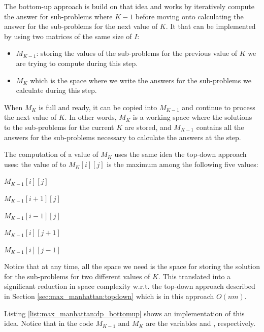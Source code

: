 The bottom-up approach is build on that idea and works by iteratively compute the answer for sub-problems where $K-1$ before moving onto calculating the answer for the sub-problems for the next value of $K$.
It that can be implemented by using two matrices of the same size of $I$:
\begin{itemize}
	\item $M_{K-1}$: storing the values of the sub-problems for the previous value of $K$ we are trying to compute during this step.
	\item $M_{K}$ which is the space where we write the answers for the sub-problems we calculate during this step.
\end{itemize}
When $M_{K}$ is full and ready, it can be copied into $M_{K-1}$ and continue to process the next value of $K$. In other words,
$M_{K}$ is a working space where the solutions to the sub-problems for the current $K$ are stored,
and $M_{K-1}$ contains all the answers for the sub-problems necessary to calculate the answers at the step.

The computation of a value of $M_{K}$ uses the same idea the top-down approach uses: the value of  to $M_K[i][j]$ is the maximum  among
the following five values: 
\begin{enumerate*}
	\item $M_{K-1}[i][j]$
	\item $M_{K-1}[i+1][j]$
	\item $M_{K-1}[i-1][j]$
	\item $M_{K-1}[i][j+1]$
	\item $M_{K-1}[i][j-1]$
\end{enumerate*}

Notice that at any time, all the space we need is the space for storing the solution for the sub-problems for two different values of $K$.
This translated into a significant reduction in  space complexity w.r.t. the top-down approach described in Section \ref{sec:max_manhattan:topdown} which is in this approach $O(nm)$.

Listing \ref{list:max_manhattan:dp_bottomup} shows an implementation of this idea. Notice that in the code $M_{K-1}$ and $M_{K}$ are the variables  and , respectively. 


